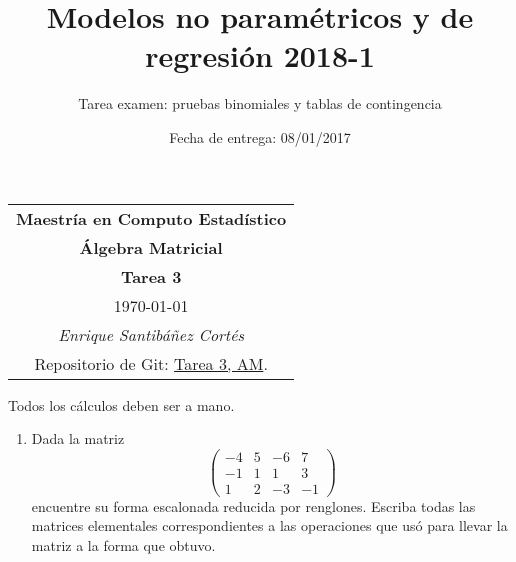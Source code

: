 \documentclass[11pt,letterpaper]{article}
\title{Modelos no paramétricos y de regresión 2018-1}
\author{Tarea examen: pruebas binomiales y tablas de contingencia}
\date{Fecha de entrega: 08/01/2017}
\begin{document}
\begin{table}[ht]
\centering
\begin{tabular}{c}
\textbf{Maestría en Computo Estadístico}\\
\textbf{Álgebra Matricial} \\
\textbf{Tarea 3}\\
\today \\
\emph{Enrique Santibáñez Cortés}\\
Repositorio de Git: \href{https://github.com/Enriquesec/Algebra_matricial/tree/master/tareas/Tarea_3}{Tarea 3, AM}.
\end{tabular}
\end{table}
Todos los cálculos deben ser a mano.

\begin{enumerate}
\item Dada la matriz
\begin{equation*}
\left( \begin{array}{rrrr}
-4 & 5 & -6 &7\\
-1 & 1 &  1 &3\\
1  & 2 & -3 &-1
\end{array} \right)
\end{equation*}
encuentre su forma escalonada reducida por renglones. Escriba todas las matrices elementales correspondientes a las operaciones que usó para llevar la matriz a la forma que obtuvo.


\end{enumerate}
\end{document}
